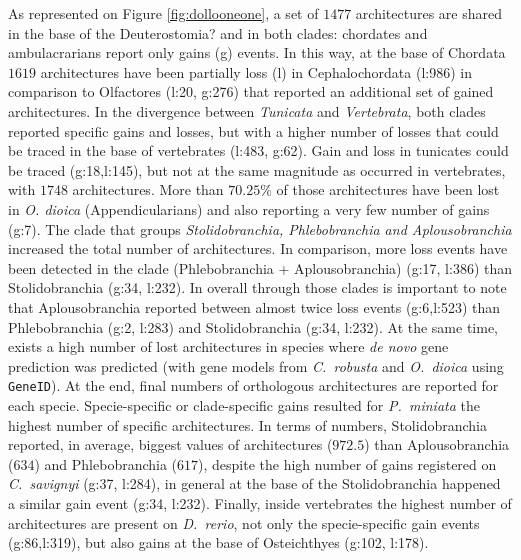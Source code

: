 \documentclass[11pt]{article}
\newcommand{\TODO}[1]{\begingroup\color{red}#1\endgroup}
\begin{document}
As represented on Figure \ref{fig:dollooneone},  a set of $1477$ architectures 
are shared in the base of the \TODO{Deuterostomia?} and in both clades: 
chordates and ambulacrarians report only gains (g) events. In this way, at the 
base of Chordata $1619$ architectures have been partially loss (l) in Cephalochordata
(l:986) in comparison to Olfactores (l:20, g:276) that reported an additional 
set of gained architectures. In the divergence between \textit{Tunicata} 
and \textit{Vertebrata}, both clades reported specific gains and losses, but with a 
higher number of losses that could be traced in the base of vertebrates (l:483, g:62).
Gain and loss in tunicates could be traced (g:18,l:145), but not at the same magnitude
as occurred in vertebrates, with $1748$ architectures. More than $70.25$\% of those architectures have been lost in \textit{O. dioica} (Appendicularians) and also reporting 
a very few number of gains (g:7). \TODO{The clade that groups} \textsl{Stolidobranchia, Phlebobranchia and Aplousobranchia} increased the total number of architectures. 
In comparison, more loss events have been detected in the clade (Phlebobranchia +
Aplousobranchia) (g:17, l:386) than Stolidobranchia (g:34, l:232). In overall through
those clades is important to note that Aplousobranchia reported 
between almost twice loss events (g:6,l:523) than Phlebobranchia (g:2, l:283) and Stolidobranchia (g:34, l:232). At the same time, exists a high number of lost 
architectures in species where \textit{de novo} gene prediction was predicted (with 
gene models from \textit{C.\ robusta} and \textit{O.\ dioica} using \texttt{GeneID}). At 
the end, final numbers of orthologous architectures are reported for each 
specie. Specie-specific or clade-specific gains resulted for \textit{P.\ miniata} 
the highest number of specific architectures. In terms of numbers, 
Stolidobranchia reported, in average, biggest values of architectures ($972.5$) 
than Aplousobranchia ($634$) and Phlebobranchia ($617$), despite the high number 
of gains registered on \textit{C.\ savignyi} (g:37, l:284), in general at the 
base of the Stolidobranchia happened a similar gain event (g:34, l:232). 
Finally, inside vertebrates the highest number of architectures are present on 
\textit{D.\ rerio}, not only the specie-specific gain events (g:86,l:319), but also 
gains at the base of Osteichthyes (g:102, l:178).
\end{document}
